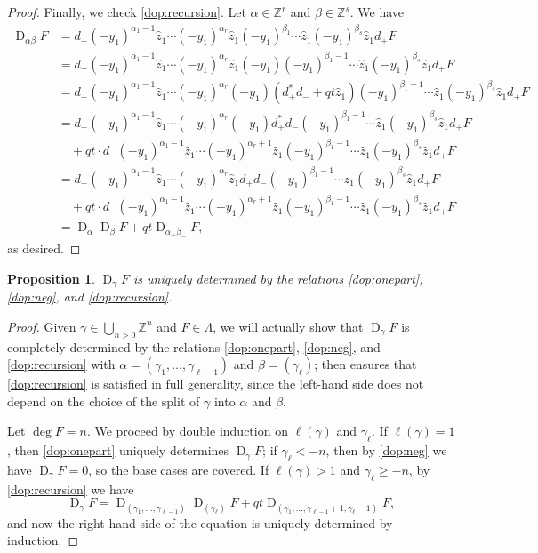 \documentclass[reqno]{amsart}
\theoremstyle{plain}
\newtheorem{proposition}[theorem]{Proposition}
\theoremstyle{definition}
\theoremstyle{remark}
\DeclareMathOperator{\D}{D}
\newcommand{\z}{\widehat{z}}
\newcommand{\<}{\langle}
\renewcommand{\>}{\rangle}
\begin{document}
\begin{proof}
    Finally, we check \eqref{dop:recursion}. Let $\alpha \in \mathbb{Z}^r$ and $\beta \in \mathbb{Z}^s$. We have
    \begin{align*}
        \D_{\alpha \beta} F & = d_- (-y_1)^{\alpha_1-1} \z_1 \cdots (-y_1)^{\alpha_r} \z_1 (-y_1)^{\beta_1} \cdots \z_1 (-y_1)^{\beta_s} \z_1 d_+ F \\
        & = d_- (-y_1)^{\alpha_1-1} \z_1 \cdots (-y_1)^{\alpha_r} \z_1 (-y_1) (-y_1)^{\beta_1-1} \cdots \z_1 (-y_1)^{\beta_s} \z_1 d_+ F \\
        & = d_- (-y_1)^{\alpha_1-1} \z_1 \cdots (-y_1)^{\alpha_r} (-y_1) (d_+^* d_- + qt \z_1) (-y_1)^{\beta_1-1} \cdots \z_1 (-y_1)^{\beta_s} \z_1 d_+ F \\
        & = d_- (-y_1)^{\alpha_1-1} \z_1 \cdots (-y_1)^{\alpha_r} (-y_1) d_+^* d_- (-y_1)^{\beta_1-1} \cdots \z_1 (-y_1)^{\beta_s} \z_1 d_+ F \\
        & \quad + qt \cdot d_- (-y_1)^{\alpha_1-1} \z_1 \cdots (-y_1)^{\alpha_r + 1} \z_1 (-y_1)^{\beta_1-1} \cdots \z_1 (-y_1)^{\beta_s} \z_1 d_+ F \\
        & = d_- (-y_1)^{\alpha_1-1} \z_1 \cdots (-y_1)^{\alpha_r} \z_1 d_+ d_- (-y_1)^{\beta_1-1} \cdots \z_1 (-y_1)^{\beta_s} \z_1 d_+ F \\
        & \quad + qt \cdot d_- (-y_1)^{\alpha_1-1} \z_1 \cdots (-y_1)^{\alpha_r + 1} \z_1 (-y_1)^{\beta_1-1} \cdots \z_1 (-y_1)^{\beta_s} \z_1 d_+ F \\
        & = \D_\alpha \D_\beta F + qt \D_{\alpha_+ \beta_-} F,
    \end{align*}
    as desired.
\end{proof}

\begin{proposition}
    \label{prop:dgamma-uniquely-determined}
    $\D_\gamma F$ is uniquely determined by the relations \eqref{dop:onepart}, \eqref{dop:neg}, and \eqref{dop:recursion}.
\end{proposition}

\begin{proof}
    Given $\gamma \in \bigcup_{n > 0} \mathbb{Z}^n$ and $F \in \Lambda$, we will actually show that $\D_\gamma F$ is completely determined by the relations \eqref{dop:onepart}, \eqref{dop:neg}, and \eqref{dop:recursion} with $\alpha = (\gamma_1, \dots, \gamma_{\ell-1})$ and $\beta = (\gamma_\ell)$; then  ensures that \eqref{dop:recursion} is satisfied in full generality, since the left-hand side does not depend on the choice of the split of $\gamma$ into $\alpha$ and $\beta$.

    Let $\deg F = n$. We proceed by double induction on $\ell(\gamma)$ and $\gamma_\ell$. If $\ell(\gamma) = 1$, then \eqref{dop:onepart} uniquely determines $\D_\gamma F$; if $\gamma_\ell < -n$, then by \eqref{dop:neg} we have $\D_\gamma F = 0$, so the base cases are covered. If $\ell(\gamma) > 1$ and $\gamma_\ell \geq -n$, by \eqref{dop:recursion} we have \[ \D_\gamma F = \D_{(\gamma_1, \dots, \gamma_{\ell-1})} \D_{(\gamma_\ell)} F + qt \D_{(\gamma_1, \dots, \gamma_{\ell-1}+1, \gamma_\ell-1)} F, \] and now the right-hand side of the equation is uniquely determined by induction.
\end{proof}
\end{document}
